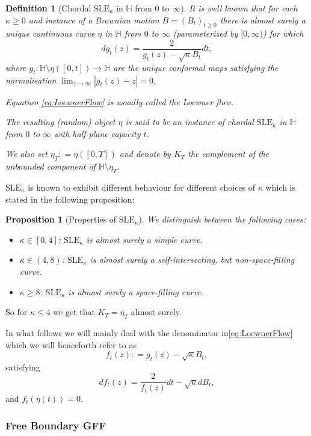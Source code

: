 \documentclass[11pt,reqno]{amsart}
\numberwithin{equation}{section}
\newtheorem{pro}[thm]{Proposition}
\newtheorem{defi}[thm]{Definition}
\newcommand{\deq}{\mathrel{\mathop:}=}
\begin{document}
\begin{defi}[Chordal $\text{SLE}_\kappa$ in $\mathbb H$ from $0$ to $\infty$]
	It is well known that for each $\kappa\geq 0$ and instance of a Brownian motion $B=(B_t)_{t\geq 0}$ there is almost surely a unique continuous curve $\eta$ in $\mathbb H$ from $0$ to $\infty$ (parameterized by $[0,\infty)$) for which
	\begin{equation}\label{eq:LoewnerFlow}
		dg_t(z)=\frac{2}{g_t(z)-\sqrt\kappa B_t}dt,
	\end{equation}
where $g_t:\mathbb H\setminus\eta([0,t])\rightarrow\mathbb H$ are the unique conformal maps satisfying the normalisation $\lim_{z\rightarrow\infty}|g_t(z)-z|=0$.

Equation \eqref{eq:LoewnerFlow} is usually called the Loewner flow.

The resulting (random) object $\eta$ is said to be an instance of chordal $\text{SLE}_\kappa$ in $\mathbb H$ from $0$ to $\infty$ with half-plane capacity $t$.

We also set $\eta_T\deq\eta([0,T])$ and denote by $K_T$ the complement of the unbounded component of $\mathbb H\setminus\eta_T$.
\end{defi}
$\text{SLE}_\kappa$ is known to exhibit different behaviour for different choices of $\kappa$ which is stated in the following proposition:
\begin{pro}[Properties of $\text{SLE}_\kappa$] We distinguish between the following cases:
	\begin{itemize}
		\item $\kappa\in[0,4]$: $\text{SLE}_\kappa$ is almost surely a simple curve.
		\item $\kappa\in(4,8)$: $\text{SLE}_\kappa$ is almost surely a self-intersecting, but non-space-filling curve.
		\item $\kappa\geq 8$: $\text{SLE}_\kappa$ is almost surely a space-filling curve.
	\end{itemize}
\end{pro}
So for $\kappa\leq 4$ we get that $K_T=\eta_T$ almost surely.

In what follows we will mainly deal with the denominator in\eqref{eq:LoewnerFlow} which we will henceforth refer to as $$f_t(z)\deq g_t(z)-\sqrt{\kappa}B_t,$$ satisfying $$df_t(z)=\frac{2}{f_t(z)}dt-\sqrt\kappa dB_t,$$ and $f_t(\eta(t))=0$.


\subsubsection{Free Boundary GFF}
\end{document}

